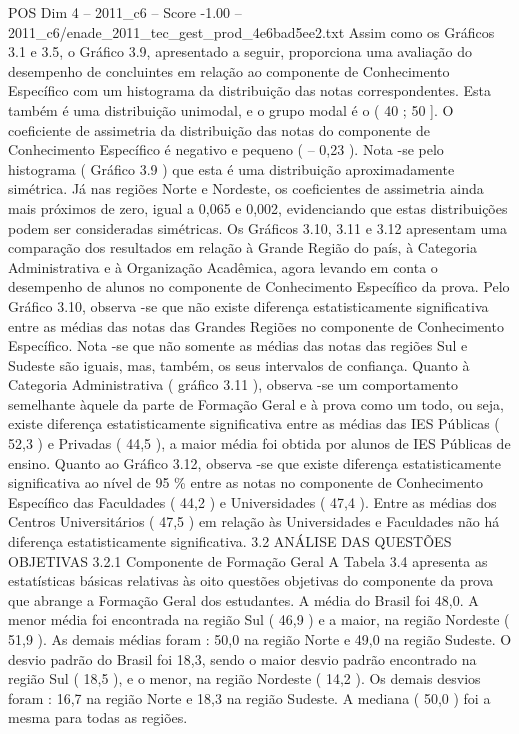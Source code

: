\begin{textsample}{POS Dim 4 – 2011\_c6 – Score -1.00 – 2011\_c6/enade\_2011\_tec\_gest\_prod\_4e6bad5ee2.txt}
Assim como os Gráficos 3.1 e 3.5, o Gráfico 3.9, apresentado a seguir, proporciona uma avaliação do desempenho de concluintes em relação ao componente de Conhecimento Específico com um histograma da distribuição das notas correspondentes.
Esta também é uma distribuição unimodal, e o grupo modal é o ( 40 ; 50 ].
O coeficiente de assimetria da distribuição das notas do componente de Conhecimento Específico é negativo e pequeno ( – 0,23 ).
Nota -se pelo histograma ( Gráfico 3.9 ) que esta é uma distribuição aproximadamente simétrica.
Já nas regiões Norte e Nordeste, os coeficientes de assimetria ainda mais próximos de zero, igual a 0,065 e 0,002, evidenciando que estas distribuições podem ser consideradas simétricas.
Os Gráficos 3.10, 3.11 e 3.12 apresentam uma comparação dos resultados em relação à Grande Região do país, à Categoria Administrativa e à Organização Acadêmica, agora levando em conta o desempenho de alunos no componente de Conhecimento Específico da prova.
Pelo Gráfico 3.10, observa -se que não existe diferença estatisticamente significativa entre as médias das notas das Grandes Regiões no componente de Conhecimento Específico.
Nota -se que não somente as médias das notas das regiões Sul e Sudeste são iguais, mas, também, os seus intervalos de confiança.
Quanto à Categoria Administrativa ( gráfico 3.11 ), observa -se um comportamento semelhante àquele da parte de Formação Geral e à prova como um todo, ou seja, existe diferença estatisticamente significativa entre as médias das IES Públicas ( 52,3 ) e Privadas ( 44,5 ), a maior média foi obtida por alunos de IES Públicas de ensino.
Quanto ao Gráfico 3.12, observa -se que existe diferença estatisticamente significativa ao nível de 95 \% entre as notas no componente de Conhecimento Específico das Faculdades ( 44,2 ) e Universidades ( 47,4 ).
Entre as médias dos Centros Universitários ( 47,5 ) em relação às Universidades e Faculdades não há diferença estatisticamente significativa. 3.2 ANÁLISE DAS QUESTÕES OBJETIVAS 3.2.1 Componente de Formação Geral A Tabela 3.4 apresenta as estatísticas básicas relativas às oito questões objetivas do componente da prova que abrange a Formação Geral dos estudantes.
A média do Brasil foi 48,0.
A menor média foi encontrada na região Sul ( 46,9 ) e a maior, na região Nordeste ( 51,9 ).
As demais médias foram : 50,0 na região Norte e 49,0 na região Sudeste.
O desvio padrão do Brasil foi 18,3, sendo o maior desvio padrão encontrado na região Sul ( 18,5 ), e o menor, na região Nordeste ( 14,2 ).
Os demais desvios foram : 16,7 na região Norte e 18,3 na região Sudeste.
A mediana ( 50,0 ) foi a mesma para todas as regiões.

\end{textsample}

